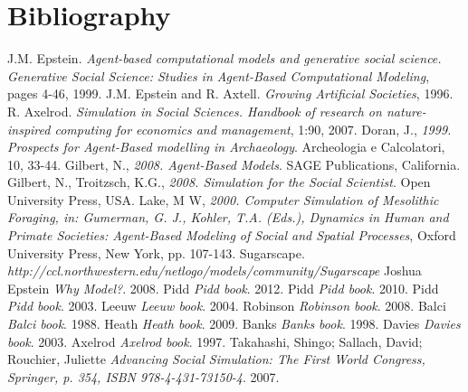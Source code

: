 \documentclass{report}
\begin{document}
\chapter{Bibliography}
\begin{thebibliography}{13}
	J.M. Epstein. 
	\emph{Agent-based computational models and generative social science. Generative Social
	Science: Studies in Agent-Based Computational Modeling}, pages 4-46, 1999.
	J.M. Epstein and R. Axtell.
	\emph{Growing Artificial Societies}, 1996.
	R. Axelrod. 
	\emph{Simulation in Social Sciences. Handbook of research on nature-inspired computing for economics and management}, 1:90, 2007.
	Doran, J., 
	\emph{1999. Prospects for Agent-Based modelling in Archaeology}. Archeologia e Calcolatori, 10, 33-44.
	Gilbert, N.,
	\emph{2008. Agent-Based Models}. SAGE Publications, California.
	Gilbert, N., Troitzsch, K.G.,
	\emph{2008. Simulation for the Social Scientist}. Open University Press, USA.
	Lake, M W,
	\emph{2000. Computer Simulation of Mesolithic Foraging, in: Gumerman, G. J., Kohler, T.A. (Eds.), Dynamics in Human and Primate Societies: Agent-Based Modeling of Social and Spatial Processes}, Oxford University Press, New York, pp. 107-143.
	Sugarscape.
	\emph{http://ccl.northwestern.edu/netlogo/models/community/Sugarscape}
	Joshua Epstein
	\emph{Why Model?}.
	2008.
	Pidd
	\emph{Pidd book}.
	2012.
	Pidd
	\emph{Pidd book}.
	2010.
	Pidd
	\emph{Pidd book}.
	2003.
	Leeuw
	\emph{Leeuw book}.
	2004.
	Robinson
	\emph{Robinson book}.
	2008.
	Balci
	\emph{Balci book}.
	1988.
	Heath
	\emph{Heath book}.
	2009.
	Banks
	\emph{Banks book}.
	1998.
	Davies
	\emph{Davies book}.
	2003.
	Axelrod
	\emph{Axelrod book}.
	1997.
	Takahashi, Shingo; Sallach, David; Rouchier, Juliette
	\emph{Advancing Social Simulation: The First World Congress, Springer, p. 354, ISBN 978-4-431-73150-4}.
	2007.



\end{thebibliography}
\end{document}
